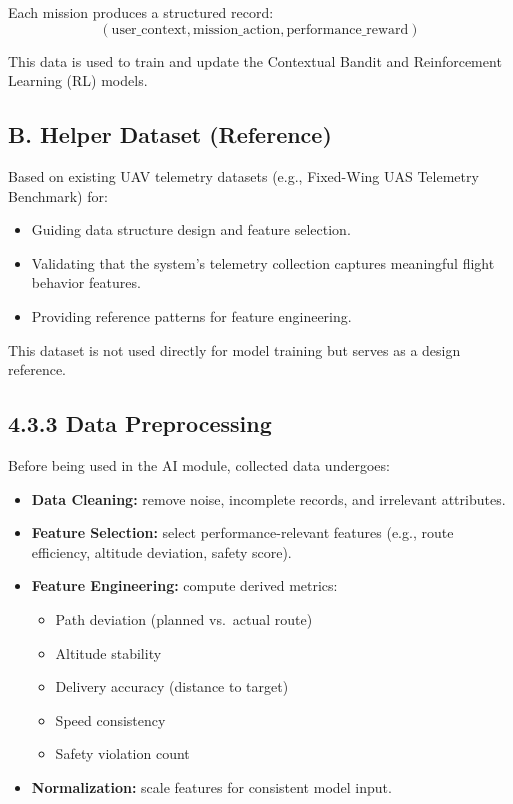 Each mission produces a structured record:
\[
(\text{user\_context}, \text{mission\_action}, \text{performance\_reward})
\]

This data is used to train and update the Contextual Bandit and Reinforcement Learning (RL) models.

\subsection*{B. Helper Dataset (Reference)}

Based on existing UAV telemetry datasets (e.g., Fixed-Wing UAS Telemetry Benchmark) for:
\begin{itemize}
    \item Guiding data structure design and feature selection.
    \item Validating that the system's telemetry collection captures meaningful flight behavior features.
    \item Providing reference patterns for feature engineering.
\end{itemize}

This dataset is not used directly for model training but serves as a design reference.

\subsection*{4.3.3 Data Preprocessing}

Before being used in the AI module, collected data undergoes:
\begin{itemize}
    \item \textbf{Data Cleaning:} remove noise, incomplete records, and irrelevant attributes.
    \item \textbf{Feature Selection:} select performance-relevant features (e.g., route efficiency, altitude deviation, safety score).
    \item \textbf{Feature Engineering:} compute derived metrics:
    \begin{itemize}
        \item Path deviation (planned vs.\ actual route)
        \item Altitude stability
        \item Delivery accuracy (distance to target)
        \item Speed consistency
        \item Safety violation count
    \end{itemize}
    \item \textbf{Normalization:} scale features for consistent model input.
\end{itemize}


